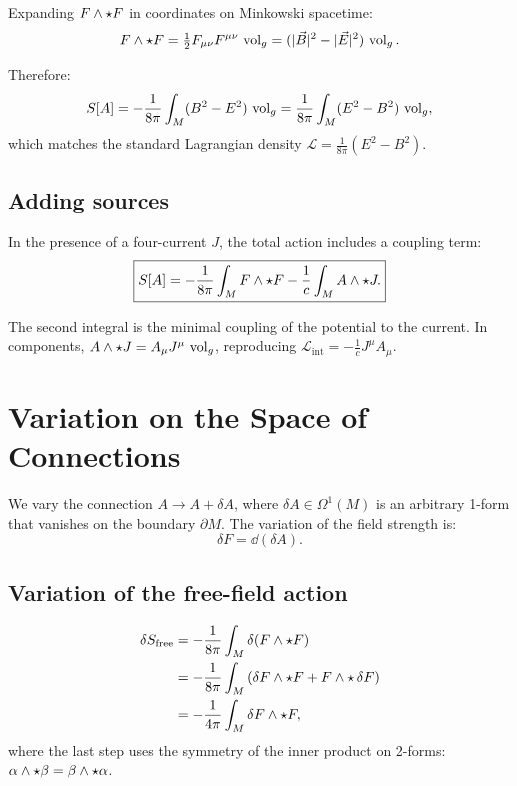 Expanding $F \wedge \star F$ in coordinates on Minkowski spacetime:
\begin{equation}
F \wedge \star F = \tfrac{1}{2}F_{\mu\nu}F^{\mu\nu}\,\operatorname{vol}_g = (|\vec{B}|^2 - |\vec{E}|^2)\,\operatorname{vol}_g.
\end{equation}

Therefore:
\begin{equation}
S[A] = -\frac{1}{8\pi}\int_M (B^2 - E^2)\,\operatorname{vol}_g = \frac{1}{8\pi}\int_M (E^2 - B^2)\,\operatorname{vol}_g,
\end{equation}
which matches the standard Lagrangian density $\mathcal{L} = \frac{1}{8\pi}(E^2 - B^2)$.

\subsection{Adding sources}

In the presence of a four-current $J$, the total action includes a coupling term:
\begin{equation}
\boxed{S[A] = -\frac{1}{8\pi}\int_M F \wedge \star F - \frac{1}{c}\int_M A \wedge \star J.}
\end{equation}

The second integral is the minimal coupling of the potential to the current. In components, $A \wedge \star J = A_\mu J^\mu\,\operatorname{vol}_g$, reproducing $\mathcal{L}_{\text{int}} = -\frac{1}{c}J^\mu A_\mu$.

\section{Variation on the Space of Connections}

We vary the connection $A \to A + \delta A$, where $\delta A \in \Omega^1(M)$ is an arbitrary 1-form that vanishes on the boundary $\partial M$. The variation of the field strength is:
\begin{equation}
\delta F = \dd(\delta A).
\end{equation}

\subsection{Variation of the free-field action}

\begin{align}
\delta S_{\text{free}} &= -\frac{1}{8\pi}\int_M \delta(F \wedge \star F) \nonumber\\
&= -\frac{1}{8\pi}\int_M \left(\delta F \wedge \star F + F \wedge \star\,\delta F\right) \nonumber\\
&= -\frac{1}{4\pi}\int_M \delta F \wedge \star F,
\end{align}
where the last step uses the symmetry of the inner product on 2-forms: $\alpha \wedge \star\beta = \beta \wedge \star\alpha$.

